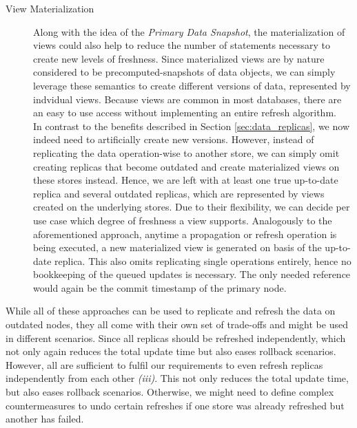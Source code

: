 \begin{description}
    \item [View Materialization]
    Along with the idea of the \emph{Primary Data Snapshot}, the materialization of views could also help to reduce the number of statements necessary to create new levels of freshness.
    Since materialized views are by nature considered to be precomputed-snapshots of data objects, we can simply leverage these semantics to create different versions of data, 
    represented by indvidual views.
    Because views are common in most databases, there are an easy to use access without implementing an entire refresh algorithm.\\
    In contrast to the benefits described in Section \ref{sec:data_replicas}, we now indeed need to artificially create new versions.
    However, instead of replicating the data operation-wise to another store, we can simply omit creating replicas that become outdated and create materialized views on these 
    stores instead. Hence, we are left with at least one true up-to-date replica and several outdated replicas, which are represented by views created on the underlying stores.
    Due to their flexibility, we can decide per use case which degree of freshness a view supports. 
    Analogously to the aforementioned approach, anytime a propagation or refresh operation is being executed, a new materialized view is generated on basis of the up-to-date replica.
    This also omits replicating single operations entirely, hence no bookkeeping of the queued updates is necessary. 
    The only needed reference would again be the commit timestamp of the primary node. 


\end{description}


While all of these approaches can be used to replicate and refresh the data on outdated nodes,
they all come with their own set of trade-offs and might be used in different scenarios.
Since all replicas should be refreshed independently, which not only again reduces the total update time but also eases rollback scenarios.
However, all are sufficient to fulfil our requirements to even refresh replicas independently from each other \textit{(iii)}.
This not only reduces the total update time, but also eases rollback scenarios. 
Otherwise, we might need to define complex countermeasures to undo certain refreshes if one store was already refreshed but another has failed.






